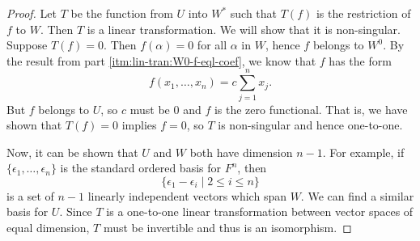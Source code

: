 \begin{enumerate}
\begin{proof}
    Let $T$ be the function from $U$ into $W^*$ such that $T(f)$ is
    the restriction of $f$ to $W$. Then $T$ is a linear
    transformation. We will show that it is non-singular. Suppose
    $T(f) = 0$. Then $f(\alpha) = 0$ for all $\alpha$ in $W$, hence
    $f$ belongs to $W^0$. By the result from part
    \ref{itm:lin-tran:W0-f-eql-coef}, we know that $f$ has the form
    \begin{equation*}
      f(x_1,\dots,x_n) = c\sum_{j=1}^nx_j.
    \end{equation*}
    But $f$ belongs to $U$, so $c$ must be $0$ and $f$ is the zero
    functional. That is, we have shown that $T(f) = 0$ implies
    $f = 0$, so $T$ is non-singular and hence one-to-one.

    Now, it can be shown that $U$ and $W$ both have dimension
    $n-1$. For example, if $\{\epsilon_1,\dots,\epsilon_n\}$ is the
    standard ordered basis for $F^n$, then
    \begin{equation*}
      \{\epsilon_1 - \epsilon_i \mid 2\leq i\leq n\}
    \end{equation*}
    is a set of $n - 1$ linearly independent vectors which span
    $W$. We can find a similar basis for $U$. Since $T$ is a
    one-to-one linear transformation between vector spaces of equal
    dimension, $T$ must be invertible and thus is an isomorphism.
  \end{proof}
\end{enumerate}



